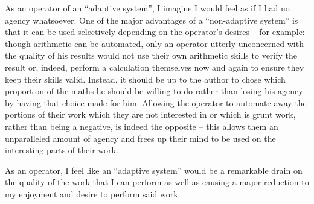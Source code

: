 \documentclass[12pt]{article}
\begin{document}
As an operator of an ``adaptive system'', I imagine I would feel as if I had no agency whatsoever. One of the major advantages of a ``non-adaptive system'' is that it can be used selectively depending on the operator's desires -- for example: though arithmetic can be automated, only an operator utterly unconcerned with the quality of his results would not use their own arithmetic skills to verify the result or, indeed, perform a calculation themselves now and again to ensure they keep their skills valid. Instead, it should be up to the author to chose which proportion of the maths he should be willing to do rather than losing his agency by having that choice made for him. Allowing the operator to automate away the portions of their work which they are not interested in or which is grunt work, rather than being a negative, is indeed the opposite -- this allows them an unparalleled amount of agency and frees up their mind to be used on the interesting parts of their work.

As an operator, I feel like an ``adaptive system'' would be a remarkable drain on the quality of the work that I can perform as well as causing a major reduction to my enjoyment and desire to perform said work.
\end{document}
